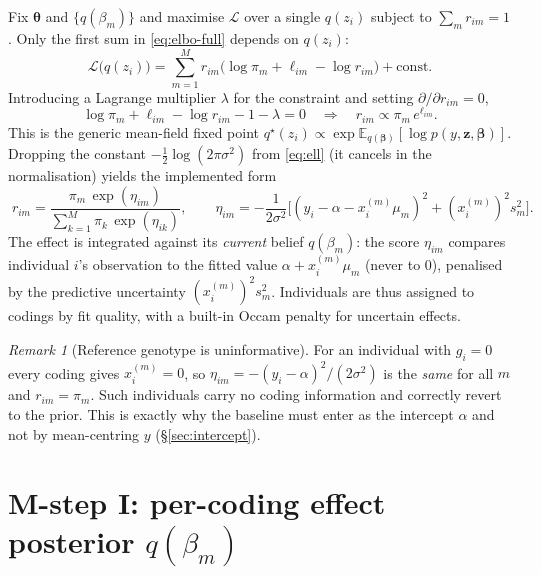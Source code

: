 \documentclass[11pt]{article}
\newcommand{\E}{\mathbb{E}}
\newcommand{\sigsq}{\sigma^{2}}
\newcommand{\const}{\mathrm{const}}
\newcommand{\xim}{x_i^{(m)}}
\newcommand{\half}{\tfrac{1}{2}}
\theoremstyle{plain}
\theoremstyle{remark}
\newtheorem{remark}{Remark}
\begin{document}
Fix $\bm\theta$ and $\{q(\beta_m)\}$ and maximise $\mathcal L$ over a single
$q(z_i)$ subject to $\sum_m r_{im}=1$. Only the first sum in
\eqref{eq:elbo-full} depends on $q(z_i)$:
\begin{equation}
  \mathcal L\big(q(z_i)\big)
  =\sum_{m=1}^{M} r_{im}\big(\log\pi_m+\ell_{im}-\log r_{im}\big)+\const .
\end{equation}
Introducing a Lagrange multiplier $\lambda$ for the constraint and setting
$\partial/\partial r_{im}=0$,
\begin{equation}
  \log\pi_m+\ell_{im}-\log r_{im}-1-\lambda=0
  \quad\Longrightarrow\quad
  r_{im}\propto \pi_m\,e^{\ell_{im}} .
\end{equation}
This is the generic mean-field fixed point
$q^\star(z_i)\propto\exp\E_{q(\bm\beta)}[\log p(y,\bm z,\bm\beta)]$. Dropping the
constant $-\half\log(2\pi\sigsq)$ from \eqref{eq:ell} (it cancels in the
normalisation) yields the implemented form
\begin{equation}\label{eq:rstep}
\boxed{\;
  r_{im}
  =\frac{\pi_m\,\exp(\eta_{im})}{\sum_{k=1}^{M}\pi_k\,\exp(\eta_{ik})},
  \qquad
  \eta_{im}=-\frac{1}{2\sigsq}\Big[(y_i-\alpha-\xim\mu_m)^2+(\xim)^2 s_m^2\Big].
\;}
\end{equation}
The effect is integrated against its \emph{current} belief $q(\beta_m)$: the
score $\eta_{im}$ compares individual $i$'s observation to the fitted value
$\alpha+\xim\mu_m$ (never to $0$), penalised by the predictive uncertainty
$(\xim)^2 s_m^2$. Individuals are thus assigned to codings by fit quality, with a
built-in Occam penalty for uncertain effects.

\begin{remark}[Reference genotype is uninformative]\label{rmk:g0}
For an individual with $g_i=0$ every coding gives $\xim=0$, so
$\eta_{im}=-(y_i-\alpha)^2/(2\sigsq)$ is the \emph{same} for all $m$ and
$r_{im}=\pi_m$. Such individuals carry no coding information and correctly revert
to the prior. This is exactly why the baseline must enter as the intercept
$\alpha$ and not by mean-centring $y$ (\S\ref{sec:intercept}).
\end{remark}

\section{M-step I: per-coding effect posterior $q(\beta_m)$}\label{sec:qbeta}
\end{document}
